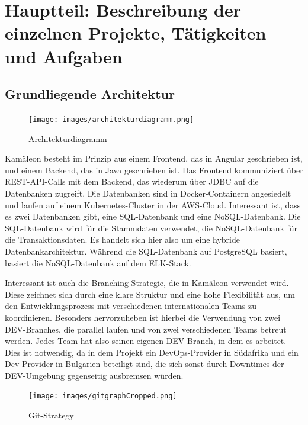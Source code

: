 \documentclass[11pt, a4paper, oneside]{scrartcl}
\begin{document}
    \section[Hauptteil]{Hauptteil: Beschreibung der einzelnen Projekte, Tätigkeiten und Aufgaben}

        \subsection{Grundliegende Architektur}
            \begin{figure}[!htb] %
                \centering
                \texttt{[image: images/architekturdiagramm.png]}
                \caption{Architekturdiagramm}
            \end{figure}
            Kamäleon besteht im Prinzip aus einem Frontend, das in Angular geschrieben ist, und
            einem Backend, das in Java geschrieben ist.
            Das Frontend kommuniziert über REST-API-Calls mit dem Backend, das wiederum über JDBC
            auf die Datenbanken zugreift.
            Die Datenbanken sind in Docker-Containern angesiedelt und laufen auf einem
            Kubernetes-Cluster in der AWS-Cloud.
            Interessant ist, dass es zwei Datenbanken gibt, eine SQL-Datenbank und eine
            NoSQL-Datenbank.
            Die SQL-Datenbank wird für die Stammdaten verwendet, die NoSQL-Datenbank für die
            Transaktionsdaten.
            Es handelt sich hier also um eine hybride Datenbankarchitektur.
            Während die SQL-Datenbank auf PostgreSQL basiert, basiert die NoSQL-Datenbank auf dem
            ELK-Stack.\par
            Interessant ist auch die Branching-Strategie, die in Kamäleon verwendet wird.
            Diese zeichnet sich durch eine klare Struktur und eine hohe Flexibilität aus,
            um den Entwicklungsprozess mit verschiedenen internationalen Teams zu koordinieren.
            Besonders hervorzuheben ist hierbei die Verwendung von zwei DEV-Branches,
            die parallel laufen und von zwei verschiedenen Teams betreut werden.
            Jedes Team hat also seinen eigenen DEV-Branch, in dem es arbeitet.
            Dies ist notwendig, da in dem Projekt ein DevOps-Provider in Südafrika und ein
            Dev-Provider in Bulgarien beteiligt sind, die sich sonst durch Downtimes der
            DEV-Umgebung gegenseitig ausbremsen würden.

            \begin{figure}[H] %
                \centering
                \texttt{[image: images/gitgraphCropped.png]}
                \caption{Git-Strategy}
            \end{figure}
\end{document}
